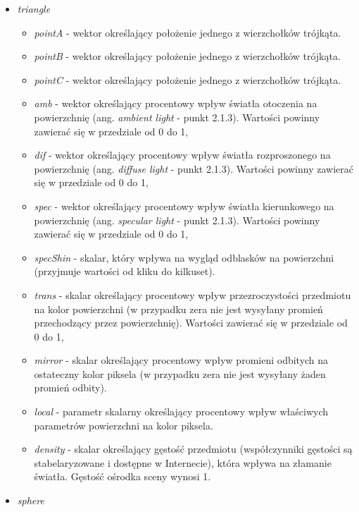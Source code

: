 \begin{itemize}
\item \emph{triangle}

	\begin{itemize}
		\item \emph{pointA} - wektor określający położenie jednego z wierzchołków trójkąta.
		\item \emph{pointB} - wektor określający położenie jednego z wierzchołków trójkąta.
		\item \emph{pointC} - wektor określający położenie jednego z wierzchołków trójkąta.
		\item \emph{amb} - wektor określający procentowy wpływ światła otoczenia na powierzchnię (ang. \emph{ambient light} - punkt 2.1.3). Wartości powinny zawierać się w przedziale od 0 do 1,
		\item \emph{dif} - wektor określający procentowy wpływ światła rozproszonego na powierzchnię (ang. \emph{diffuse light} - punkt 2.1.3). Wartości powinny zawierać się w przedziale od 0 do 1,
		\item \emph{spec} - wektor określający procentowy wpływ światła kierunkowego na powierzchnię (ang. \emph{specular light} - punkt 2.1.3). Wartości powinny zawierać się w przedziale od 0 do 1,
		\item \emph{specShin} - skalar, który wpływa na wygląd odblasków na powierzchni (przyjmuje wartości od kliku do kilkuset).
		\item \emph{trans} - skalar określający procentowy wpływ przezroczystości przedmiotu na kolor powierzchni (w przypadku zera nie jest wysyłany promień przechodzący przez powierzchnię). Wartości zawierać się w przedziale od 0 do 1,
		\item \emph{mirror} - skalar określający procentowy wpływ promieni odbitych na ostateczny kolor piksela (w przypadku zera nie jest wysyłany żaden promień odbity).
		\item \emph{local} - parametr skalarny określający procentowy wpływ właściwych parametrów powierzchni na kolor piksela.
		\item \emph{density} - skalar określający gęstość przedmiotu (współczynniki gęstości są stabelaryzowane i dostępne w Internecie), która wpływa na złamanie światła. Gęstość ośrodka sceny wynosi 1.
	\end{itemize}

\item \emph{sphere}


\end{itemize}
